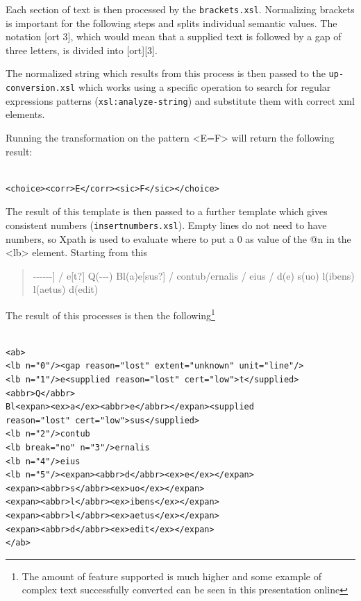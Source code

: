 \documentclass[amsthm,ebook]{saparticle}
\begin{document}
Each section of text is then processed by the \texttt{brackets.xsl}. Normalizing brackets is important for the following steps and splits individual semantic values. The notation [ort 3], which would mean that a supplied text is followed by a gap of three letters, is divided into [ort][3].

The normalized string which results from this process is then passed to the 
\texttt{up-conversion.xsl} which works using a specific operation to search for regular expressions patterns (\texttt{xsl:analyze-string}) and substitute them with correct xml elements.

Running the transformation on the pattern {\textless}E=F{\textgreater} will return the following result:

\begin{verbatim}

<choice><corr>E</corr><sic>F</sic></choice>

\end{verbatim}


The result of this template is then passed to a further template which gives consistent numbers (\texttt{insertnumbers.xsl}). Empty lines do not need to have numbers, so Xpath is used to evaluate where to put a 0 as value of the @n in the {\textless}lb{\textgreater} element. Starting from this

\begin{quotation}
{}-{}-{}-{}-{}-{}-] / e[t?] Q(-{}-{}-) Bl(a)e[sus?] / contub/ernalis / eius / d(e) s(uo) l(ibens) l(aetus) d(edit)
\end{quotation}

The result of this processes is then the following\footnote{The amount of feature supported is much higher and some example of complex text successfully converted can be seen in this presentation online}

\begin{verbatim}

<ab>
<lb n="0"/><gap reason="lost" extent="unknown" unit="line"/>
<lb n="1"/>e<supplied reason="lost" cert="low">t</supplied> 
<abbr>Q</abbr> 
Bl<expan><ex>a</ex><abbr>e</abbr></expan><supplied
reason="lost" cert="low">sus</supplied>
<lb n="2"/>contub
<lb break="no" n="3"/>ernalis
<lb n="4"/>eius
<lb n="5"/><expan><abbr>d</abbr><ex>e</ex></expan> 
<expan><abbr>s</abbr><ex>uo</ex></expan> 	
<expan><abbr>l</abbr><ex>ibens</ex></expan> 
<expan><abbr>l</abbr><ex>aetus</ex></expan> 	
<expan><abbr>d</abbr><ex>edit</ex></expan>
</ab>
\end{verbatim}
\end{document}
